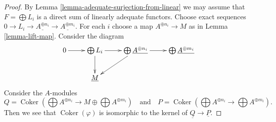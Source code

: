 \documentclass{stacks-project}
\theoremstyle{plain}
\theoremstyle{definition}
\theoremstyle{remark}
\numberwithin{equation}{subsection}
\def\Coker{\mathop{\mathrm{Coker}}}
\begin{document}
\begin{proof}
By
Lemma \ref{lemma-adequate-surjection-from-linear}
we may assume that $F = \bigoplus L_i$ is a direct sum of linearly adequate
functors. Choose exact sequences
$0 \to L_i \to \underline{A^{\oplus n_i}} \to \underline{A^{\oplus m_i}}$.
For each $i$ choose a map $A^{\oplus n_i} \to M$ as in
Lemma \ref{lemma-lift-map}.
Consider the diagram
$$
\xymatrix{
0 \ar[r] &
\bigoplus L_i  \ar[r] \ar[d] &
\bigoplus \underline{A^{\oplus n_i}} \ar[r] \ar[ld] &
\bigoplus \underline{A^{\oplus m_i}} \\
& \underline{M}
}
$$
Consider the $A$-modules
$$
Q =
\Coker(\bigoplus A^{\oplus n_i} \to M \oplus \bigoplus A^{\oplus m_i})
\quad\text{and}\quad
P = \Coker(\bigoplus A^{\oplus n_i} \to \bigoplus A^{\oplus m_i}).
$$
Then we see that $\Coker(\varphi)$ is isomorphic to the
kernel of $\underline{Q} \to \underline{P}$.
\end{proof}
\end{document}
